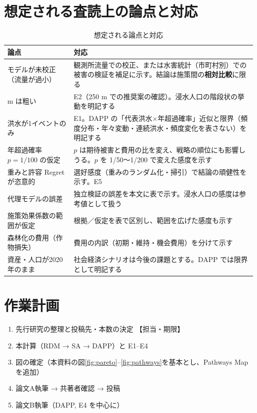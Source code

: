 \documentclass[a4paper,10pt]{ltjsarticle}
\newcommand{\todo}[1]{\textcolor{corange}{【#1】}}
\begin{document}
\section{想定される査読上の論点と対応}
\label{sec:review}
\begin{table}[H]
\centering\small
\caption{想定される論点と対応}
\begin{tabularx}{\linewidth}{@{}>{\raggedright\arraybackslash}p{42mm}X@{}}
\toprule
論点 & 対応 \\
\midrule
モデルが未校正（流量が過小） & 観測所流量での校正、または水害統計（市町村別）での被害の検証を補足に示す。結論は施策間の\textbf{相対比較}に限る \\
1000 m は粗い & E2（250 m での推奨案の確認）。浸水人口の階段状の挙動を明記する \\
洪水が1イベントのみ & E1。DAPP の「代表洪水×年超過確率」近似と限界（頻度分布・年々変動・連続洪水・頻度変化を表さない）を明記する \\
年超過確率 $p=1/100$ の仮定 & $p$ は期待被害と費用の比を変え、戦略の順位にも影響しうる。$p$ を 1/50〜1/200 で変えた感度を示す \\
重みと許容 Regret が恣意的 & 選好感度（重みのランダム化・掃引）で結論の頑健性を示す。E5 \\
代理モデルの誤差 & 独立検証の誤差を本文に表で示す。浸水人口の感度は参考値として扱う \\
施策効果係数の範囲が仮定 & 根拠／仮定を表で区別し、範囲を広げた感度も示す \\
森林化の費用（作物損失） & 費用の内訳（初期・維持・機会費用）を分けて示す \\
資産・人口が2020年のまま & 社会経済シナリオは今後の課題とする。DAPP では限界として明記する \\
\bottomrule
\end{tabularx}
\end{table}

\section{作業計画}
\begin{enumerate}
\item 先行研究の整理と投稿先・本数の決定 \todo{担当・期限}
\item 本計算（RDM → SA → DAPP）と E1–E4
\item 図の確定（本資料の図\ref{fig:pareto}–\ref{fig:pathways}を基本とし、Pathways Map を追加）
\item 論文A執筆 → 共著者確認 → 投稿
\item 論文B執筆（DAPP, E4 を中心に）
\end{enumerate}
\end{document}
